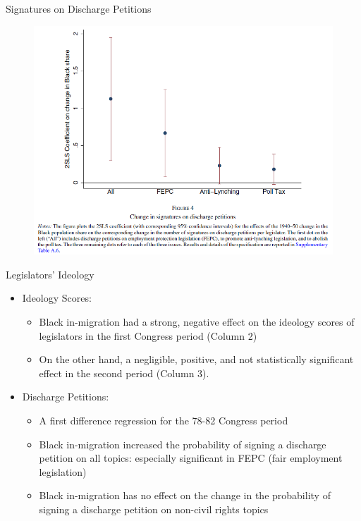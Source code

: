 \documentclass[dvipdfmx,11pt]{beamer}
\begin{document}
\begin{frame}{Signatures on Discharge Petitions}
  \begin{figure}
    \centering
    \includegraphics[scale = .5]{fig_tab/os20220708/F4.png}
  \end{figure}
\end{frame}

\begin{frame}{Legislators' Ideology}
  \begin{itemize}
    \item Ideology Scores:
    \begin{itemize}
      \item Black in-migration had a strong, negative effect on the ideology scores of legislators in the first Congress period (Column 2)
      \item On the other hand, a negligible, positive, and not statistically significant effect in the second period (Column 3).
    \end{itemize}
    \item Discharge Petitions:
    \begin{itemize}
      \item A first difference regression for the 78-82 Congress period
      \item Black in-migration increased the probability of signing a discharge petition on all topics: especially significant in FEPC (fair employment legislation)
      \item Black in-migration has no effect on the change in the probability of signing a discharge petition on non-civil rights topics
    \end{itemize}
  \end{itemize}
\end{frame}
\end{document}
